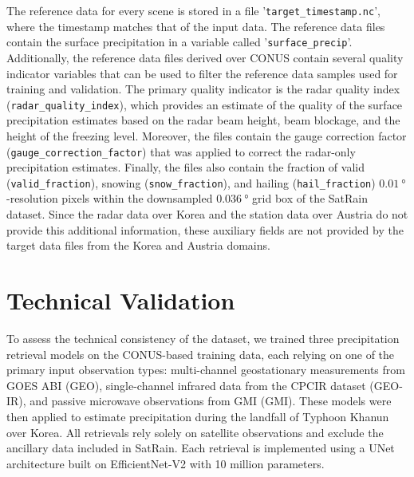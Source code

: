 \documentclass[11pt]{article}
\begin{document}
The reference data for every scene is stored in a file
'\texttt{target\_\textlangle timestamp\textrangle.nc}', where the timestamp
matches that of the input data. The reference data files contain the surface
precipitation in a variable called '\texttt{surface\_precip}'. Additionally, the
reference data files derived over CONUS contain several quality indicator
variables that can be used to filter the reference data samples used for
training and validation. The primary quality indicator is the radar quality
index (\texttt{radar\_quality\_index}), which provides an estimate of the
quality of the surface precipitation estimates based on the radar beam height,
beam blockage, and the height of the freezing level. Moreover, the files contain
the gauge correction factor (\texttt{gauge\_correction\_factor}) that was
applied to correct the radar-only precipitation estimates. Finally, the files
also contain the fraction of valid (\texttt{valid\_fraction}), snowing
(\texttt{snow\_fraction}), and hailing (\texttt{hail\_fraction})
$\SI{0.01}{\degree}$-resolution pixels within the downsampled $\SI{0.036}{\degree}$ grid box of
the SatRain dataset. Since the radar data over Korea and the station data over
Austria do not provide this additional information, these auxiliary fields are
not provided by the target data files from the Korea and Austria domains.


\section{Technical Validation}

To assess the technical consistency of the dataset, we trained three
precipitation retrieval models on the CONUS-based training data, each relying on
one of the primary input observation types: multi-channel geostationary
measurements from GOES ABI (GEO), single-channel infrared data from the CPCIR
dataset (GEO-IR), and passive microwave observations from GMI (GMI). These
models were then applied to estimate precipitation during the landfall of
Typhoon Khanun over Korea. All retrievals rely solely on satellite observations
and exclude the ancillary data included in SatRain. Each retrieval is
implemented using a UNet architecture built on EfficientNet-V2 with 10 million
parameters.
\end{document}
